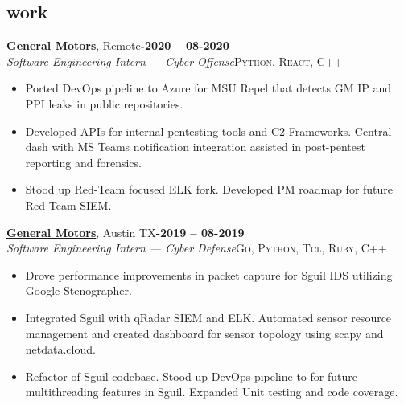 \documentclass[margin,10pt]{res}
\begin{document}
\begin{resume}
\section{\sc \lsstyle work}
    \href{https://www.gm.com/}{\textbf{General Motors}}, Remote\hfill \textsc{\bfseries{}-2020 -- 08-2020}\\
    \textit{Software Engineering Intern --- Cyber Offense}\hfill \textsc{Python, React, C++}
    \vspace{0.5em}
    \begin{itemize}
        \item Ported DevOps pipeline to Azure for MSU Repel that detects GM IP and PPI leaks in public repositories.
        \item Developed APIs for internal pentesting tools and C2 Frameworks. Central dash with MS Teams notification integration assisted in post-pentest reporting and forensics. 
        \item Stood up Red-Team focused ELK fork. Developed PM roadmap for future Red Team SIEM.
    \end{itemize}

    \href{https://www.gm.com/}{\textbf{General Motors}}, Austin TX\hfill \textsc{\bfseries{}-2019 -- 08-2019}\\
    \textit{Software Engineering Intern --- Cyber Defense}\hfill \textsc{Go, Python, Tcl, Ruby, C++}
    \vspace{0.5em}
    \begin{itemize}
        \item Drove performance improvements in packet capture for Sguil IDS utilizing Google Stenographer. 
        \item Integrated Sguil with qRadar SIEM and ELK. Automated sensor resource management and created dashboard for sensor topology using scapy and netdata.cloud.
        \item Refactor of Sguil codebase. Stood up DevOps pipeline to for future multithreading features in Sguil. Expanded Unit testing and code coverage.
    \end{itemize}


\end{resume}
\end{document}
